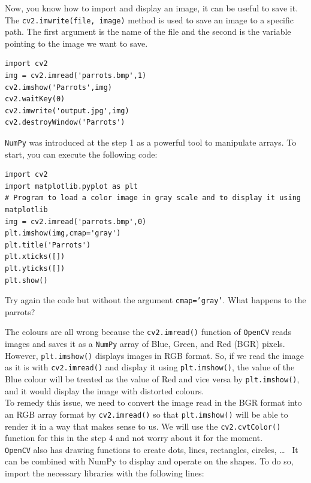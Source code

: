 \documentclass{labo}
\newcommand{\numpy}{\texttt{NumPy} }
\newcommand{\opencv}{\texttt{OpenCV} }
\begin{document}
Now, you know how to import and display an image, it can be useful to save it.
The \texttt{cv2.imwrite(file, image)} method is used to save an image to a specific path. The first argument is the name of the file and the second is the variable pointing to the image we want to save.

\begin{verbatim}
import cv2
img = cv2.imread('parrots.bmp',1)
cv2.imshow('Parrots',img)
cv2.waitKey(0)
cv2.imwrite('output.jpg',img)
cv2.destroyWindow('Parrots')
\end{verbatim}


\numpy was introduced at the step 1 as a powerful tool to manipulate arrays. To start, you can execute the following code:

\begin{verbatim}
import cv2
import matplotlib.pyplot as plt
# Program to load a color image in gray scale and to display it using matplotlib
img = cv2.imread('parrots.bmp',0)
plt.imshow(img,cmap='gray')
plt.title('Parrots')
plt.xticks([])
plt.yticks([])
plt.show()
\end{verbatim}

\begin{leftbar}
Try again the code but without the argument \texttt{cmap=’gray’}. What happens to the parrots?
\end{leftbar}

The colours are all wrong because the \texttt{cv2.imread()} function of \opencv reads images and saves it as a \numpy array of Blue, Green, and Red (BGR) pixels.\\

However, \texttt{plt.imshow()} displays images in RGB format. So, if we read the image as it is with \texttt{cv2.imread()} and display it using \texttt{plt.imshow()}, the value of the Blue colour will be treated as the value of Red and vice versa by \texttt{plt.imshow()}, and it would display the image with distorted colours.\\

To remedy this issue, we need to convert the image read in the BGR format into an RGB array format by \texttt{cv2.imread()} so that \texttt{plt.imshow()} will be able to render it in a way that makes sense to us. We will use the \texttt{cv2.cvtColor()} function for this in the step 4 and not worry about it for the moment.\\

\opencv also has drawing functions to create dots, lines, rectangles, circles, \dots~  It can be combined with NumPy to display and operate on the shapes. To do so, import the necessary libraries with the following lines:
\end{document}
